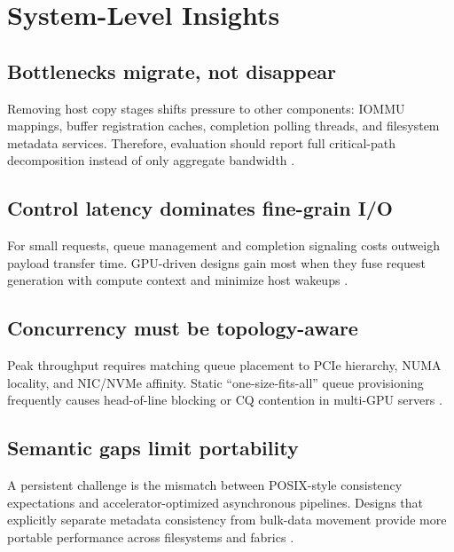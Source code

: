 \section{System-Level Insights}

\subsection{Bottlenecks migrate, not disappear}

Removing host copy stages shifts pressure to other components: IOMMU mappings, buffer registration caches, completion polling threads, and filesystem metadata services. Therefore, evaluation should report full critical-path decomposition instead of only aggregate bandwidth \cite{nvidia_gds_best_practices,spdk_overview}.

\subsection{Control latency dominates fine-grain I/O}

For small requests, queue management and completion signaling costs outweigh payload transfer time. GPU-driven designs gain most when they fuse request generation with compute context and minimize host wakeups \cite{qureshi2023bam,silberstein2013gpufs}.

\subsection{Concurrency must be topology-aware}

Peak throughput requires matching queue placement to PCIe hierarchy, NUMA locality, and NIC/NVMe affinity. Static ``one-size-fits-all'' queue provisioning frequently causes head-of-line blocking or CQ contention in multi-GPU servers \cite{pcie_spec,infiniband_spec}.

\subsection{Semantic gaps limit portability}

A persistent challenge is the mismatch between POSIX-style consistency expectations and accelerator-optimized asynchronous pipelines. Designs that explicitly separate metadata consistency from bulk-data movement provide more portable performance across filesystems and fabrics \cite{geminifs2025,nvme_spec}.
